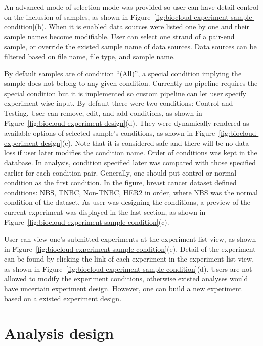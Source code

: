An advanced mode of selection mode was provided so user can have detail control
on the inclusion of samples, as shown in
Figure~\ref{fig:biocloud-experiment-sample-condition}(b). When it is enabled
data sources were listed one by one and their sample names become modifiable.
User can select one strand of a pair-end sample, or override the existed sample
name of data sources. Data sources can be filtered based on file name, file
type, and sample name.

By default samples are of condition ``(All)'', a special condition implying the
sample does not belong to any given condition. Currently no pipeline requires
the special condition but it is implemented so custom pipeline can let user
specify experiment-wise input. By default there were two conditions: Control
and Testing. User can remove, edit, and add conditions, as shown in
Figure~\ref{fig:biocloud-experiment-design}(d). They were dynamically rendered
as available options of selected sample's conditions, as shown in
Figure~\ref{fig:biocloud-experiment-design}(e). Note that it is considered safe
and there will be no data loss if user later modifies the condition name.
Order of conditions was kept in the database. In analysis, condition specified
later was compared with those specified earlier for each condition pair.
Generally, one should put control or normal condition as the first condition.
In the figure, breast cancer dataset defined conditions: NBS, TNBC, Non-TNBC,
HER2 in order, where NBS was the normal condition of the dataset. As user was
designing the conditions, a preview of the current experiment was displayed in
the last section, as shown in
Figure~\ref{fig:biocloud-experiment-sample-condition}(c).

User can view one's submitted experiments at the experiment list view, as shown
in Figure~\ref{fig:biocloud-experiment-sample-condition}(e). Detail of the
experiment can be found by clicking the link of each experiment in the
experiment list view, as shown in
Figure~\ref{fig:biocloud-experiment-sample-condition}(d). Users are not allowed
to modify the experiment conditions, otherwise existed analyses would have
uncertain experiment design. However, one can build a new experiment based on a
existed experiment design.



\section{Analysis design}

